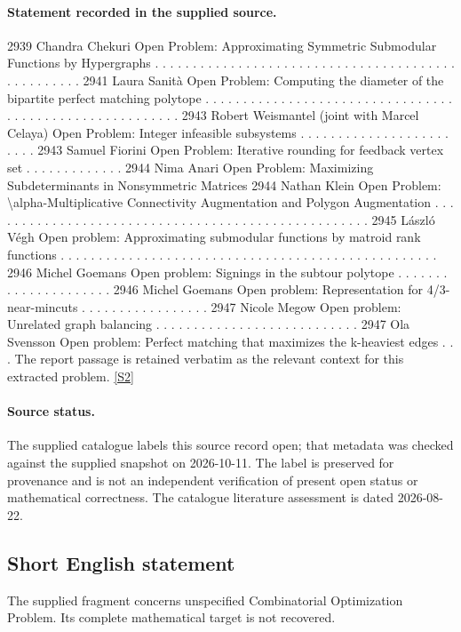 \documentclass[11pt]{article}
\newcommand{\sref}[2]{\hyperlink{source:#1:#2}{[S#2]}}
\begin{document}
\paragraph{Statement recorded in the supplied source.}
2939 Chandra Chekuri Open Problem: Approximating Symmetric Submodular Functions by Hypergraphs . . . . . . . . . . . . . . . . . . . . . . . . . . . . . . . . . . . . . . . . . . . . . . . . . . 2941 Laura Sanità Open Problem: Computing the diameter of the bipartite perfect matching polytope . . . . . . . . . . . . . . . . . . . . . . . . . . . . . . . . . . . . . . . . . . . . . . . . . . . . . . . . 2943 Robert Weismantel (joint with Marcel Celaya) Open Problem: Integer infeasible subsystems . . . . . . . . . . . . . . . . . . . . . . . . 2943 Samuel Fiorini Open Problem: Iterative rounding for feedback vertex set . . . . . . . . . . . . . 2944 Nima Anari Open Problem: Maximizing Subdeterminants in Nonsymmetric Matrices 2944 Nathan Klein Open Problem: \textbackslash{}alpha-Multiplicative Connectivity Augmentation and Polygon Augmentation . . . . . . . . . . . . . . . . . . . . . . . . . . . . . . . . . . . . . . . . . . . . . . . . . . . 2945 László Végh Open problem: Approximating submodular functions by matroid rank functions . . . . . . . . . . . . . . . . . . . . . . . . . . . . . . . . . . . . . . . . . . . . . . . . . . 2946 Michel Goemans Open problem: Signings in the subtour polytope . . . . . . . . . . . . . . . . . . . . . 2946 Michel Goemans Open problem: Representation for 4/3-near-mincuts . . . . . . . . . . . . . . . . . 2947 Nicole Megow Open problem: Unrelated graph balancing . . . . . . . . . . . . . . . . . . . . . . . . . . . 2947 Ola Svensson Open problem: Perfect matching that maximizes the k-heaviest edges . . . The report passage is retained verbatim as the relevant context for this extracted problem. \sref{statement}{2}
\paragraph{Source status.}
The supplied catalogue labels this source record open; that metadata was checked against the supplied snapshot on 2026-10-11. The label is preserved for provenance and is not an independent verification of present open status or mathematical correctness. The catalogue literature assessment is dated 2026-08-22.
\subsection{Short English statement}
The supplied fragment concerns unspecified Combinatorial Optimization Problem. Its complete mathematical target is not recovered.
\end{document}
